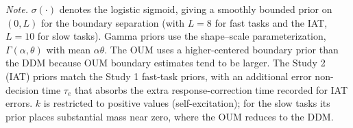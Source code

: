 \begin{table}[ht]
\vspace{4pt}
\noindent\textit{Note.} $\sigma(\cdot)$ denotes the logistic sigmoid, giving a smoothly bounded prior on $(0, L)$ for the boundary separation (with $L = 8$ for fast tasks and the IAT, $L = 10$ for slow tasks). Gamma priors use the shape--scale parameterization, $\Gamma(\alpha, \theta)$ with mean $\alpha\theta$. The OUM uses a higher-centered boundary prior than the DDM because OUM boundary estimates tend to be larger. The Study 2 (IAT) priors match the Study 1 fast-task priors, with an additional error non-decision time $\tau_e$ that absorbs the extra response-correction time recorded for IAT errors. $k$ is restricted to positive values (self-excitation); for the slow tasks its prior places substantial mass near zero, where the OUM reduces to the DDM.
\end{table}
